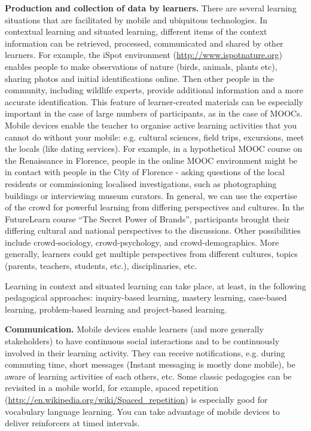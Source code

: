 \textbf{Production and collection of
data by learners.}  There are several learning situations that are
facilitated by mobile and ubiquitous technologies. In contextual
learning and situated learning, different items of the context
information can be retrieved, processed, communicated and shared by
other learners. For example, the iSpot environment
(\url{http://www.ispotnature.org}) enables people to make observations of
nature (birds, animals, plants etc), sharing photos and initial
identifications online. Then other people in the community, including
wildlife experts, provide additional information and a more accurate
identification. This feature of learner-created materials can be
especially important in the case of large numbers of participants, as in
the case of MOOCs. Mobile devices enable the teacher to organise active
learning activities that you cannot do without your mobile:
e.g. cultural sciences, field trips, excursions, meet the locals (like
dating services). For example, in a hypothetical MOOC course on the
Renaissance in Florence, people in the online MOOC environment might be
in contact with people in the City of Florence - asking questions of the
local residents or commissioning localised investigations, such as
photographing buildings or interviewing museum curators. In general, we
can use the expertise of the crowd for powerful learning from differing
perspectives and cultures. In the FutureLearn course ``The Secret Power
of Brands'', participants brought their differing cultural and national
perspectives to the discussions. Other possibilities include
crowd-sociology, crowd-psychology, and crowd-demographics. More
generally, learners could get multiple perspectives from different
cultures, topics (parents, teachers, students, etc.), disciplinaries,
etc.

 Learning in context and situated learning can take place, at least, in
the following pedagogical approaches: inquiry-based learning, mastery
learning, case-based learning, problem-based learning and project-based
learning.  

\textbf{Communication.} Mobile devices enable learners (and
more generally stakeholders) to have continuous social interactions and
to be continuously involved in their learning activity. They can receive
notifications, e.g. during commuting time, short messages (Instant
messaging is mostly done mobile), be aware of learning activities of
each others, etc. Some classic pedagogies can be revisited in a mobile
world, for example, spaced repetition
(\url{http://en.wikipedia.org/wiki/Spaced_repetition}) is especially good for
vocabulary language learning. You can take advantage of mobile devices
to deliver reinforcers at timed intervals.  


